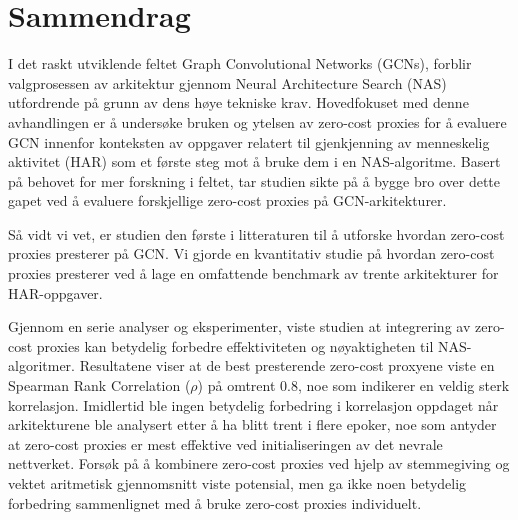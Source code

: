 \chapter*{Sammendrag}

I det raskt utviklende feltet Graph Convolutional Networks (GCNs), forblir valgprosessen av arkitektur gjennom Neural Architecture Search (NAS) utfordrende på grunn av dens høye tekniske krav. Hovedfokuset med denne avhandlingen er å undersøke bruken og ytelsen av zero-cost proxies for å evaluere GCN innenfor konteksten av oppgaver relatert til gjenkjenning av menneskelig aktivitet (HAR) som et første steg mot å bruke dem i en NAS-algoritme. Basert på behovet for mer forskning i feltet, tar studien sikte på å bygge bro over dette gapet ved å evaluere forskjellige zero-cost proxies på GCN-arkitekturer. 

Så vidt vi vet, er studien den første i litteraturen til å utforske hvordan zero-cost proxies presterer på GCN. Vi gjorde en kvantitativ studie på hvordan zero-cost proxies presterer ved å lage en omfattende benchmark av trente arkitekturer for HAR-oppgaver.

Gjennom en serie analyser og eksperimenter, viste studien at integrering av zero-cost proxies kan betydelig forbedre effektiviteten og nøyaktigheten til NAS-algoritmer. Resultatene viser at de best presterende zero-cost proxyene viste en Spearman Rank Correlation ($\rho$) på omtrent $0.8$, noe som indikerer en veldig sterk korrelasjon. Imidlertid ble ingen betydelig forbedring i korrelasjon oppdaget når arkitekturene ble analysert etter å ha blitt trent i flere epoker, noe som antyder at zero-cost proxies er mest effektive ved initialiseringen av det nevrale nettverket. Forsøk på å kombinere zero-cost proxies ved hjelp av stemmegiving og vektet aritmetisk gjennomsnitt viste potensial, men ga ikke noen betydelig forbedring sammenlignet med å bruke zero-cost proxies individuelt. 
